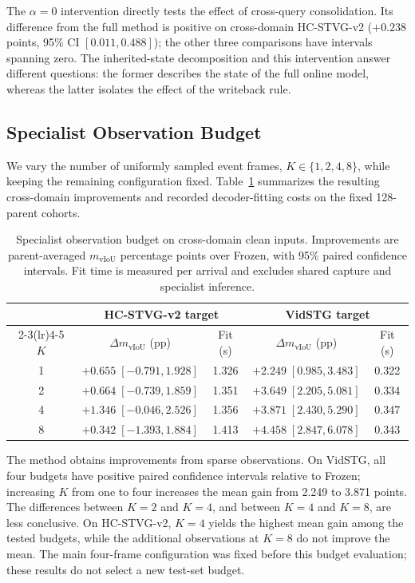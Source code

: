 \documentclass[10pt,twocolumn,letterpaper]{article}
\newcommand{\mvIoU}{\ensuremath{m_{\mathrm{vIoU}}}}
\begin{document}
The $\alpha=0$ intervention directly tests the effect of
cross-query consolidation. Its difference from the full
method is positive on cross-domain HC-STVG-v2
($+0.238$ points, 95\% CI $[0.011,0.488]$); the other
three comparisons have intervals spanning zero. The
inherited-state decomposition and this intervention answer
different questions: the former describes the state of the
full online model, whereas the latter isolates the effect
of the writeback rule.

\subsection{Specialist Observation Budget}
\label{sec:observation-budget}

We vary the number of uniformly sampled event frames,
$K\in\{1,2,4,8\}$, while keeping the remaining configuration
fixed. Table~\ref{tab:budget} summarizes the resulting
cross-domain improvements and recorded decoder-fitting
costs on the fixed 128-parent cohorts.

\begin{table}[t]
	\centering
	\caption{Specialist observation budget on cross-domain
		clean inputs. Improvements are parent-averaged \mvIoU{}
		percentage points over Frozen, with 95\% paired confidence
		intervals. Fit time is measured per arrival and excludes
		shared capture and specialist inference.}
	\label{tab:budget}
	\setlength{\tabcolsep}{9pt}
	\small
	\begin{tabular}{ccccc}
		\toprule
		& \multicolumn{2}{c}{HC-STVG-v2 target} & \multicolumn{2}{c}{VidSTG target} \\
		\cmidrule(lr){2-3}\cmidrule(lr){4-5}
		$K$ & $\Delta\mvIoU$ (pp) & Fit (s) & $\Delta\mvIoU$ (pp) & Fit (s) \\
		\midrule
		1 & $+0.655\;[-0.791,1.928]$ & 1.326
		& $+2.249\;[0.985,3.483]$ & 0.322 \\
		2 & $+0.664\;[-0.739,1.859]$ & 1.351
		& $+3.649\;[2.205,5.081]$ & 0.334 \\
		4 & $+1.346\;[-0.046,2.526]$ & 1.356
		& $+3.871\;[2.430,5.290]$ & 0.347 \\
		8 & $+0.342\;[-1.393,1.884]$ & 1.413
		& $+4.458\;[2.847,6.078]$ & 0.343 \\
		\bottomrule
	\end{tabular}
\end{table}

The method obtains improvements from sparse observations.
On VidSTG, all four budgets have positive paired confidence
intervals relative to Frozen; increasing $K$ from one to
four increases the mean gain from 2.249 to 3.871 points.
The differences between $K=2$ and $K=4$, and between
$K=4$ and $K=8$, are less conclusive. On HC-STVG-v2,
$K=4$ yields the highest mean gain among the tested
budgets, while the additional observations at $K=8$
do not improve the mean. The main four-frame configuration was fixed before this
budget evaluation; these results do not select a new test-set budget.
\end{document}
